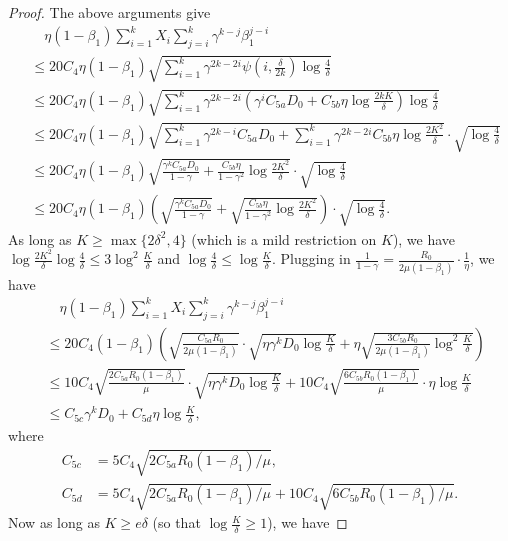 \begin{proof}
The above arguments give 
\begin{align*}
    &\quad \eta (1-\beta_1)\sum_{i=1}^{k}X_i  \sum_{j=i}^{k}\gamma^{k-j}\beta_1^{j-i} \\ &\leq 20C_4\eta(1-\beta_1)\sqrt{\sum_{i=1}^{k}\gamma^{2k-2i} \psi\left(i,\frac{\delta}{2k}\right)\log\frac{4}{\delta}} \\
    &\leq 20C_4\eta(1-\beta_1)\sqrt{\sum_{i=1}^{k}\gamma^{2k-2i} \left(\gamma
    ^i C_{5a}D_0 + C_{5b} \eta \log \frac{2kK}{\delta}\right)\log\frac{4}{\delta}} \\
    &\leq 20C_4\eta(1-\beta_1)\sqrt{\sum_{i=1}^{k}\gamma^{2k-i} C_{5a}D_0 + \sum_{i=1}^{k}\gamma^{2k-2i} C_{5b}\eta\log\frac{2K^2}{\delta}}\cdot \sqrt{\log\frac{4}{\delta}} \\
    &\leq 20C_4\eta(1-\beta_1)\sqrt{\frac{\gamma^{k}C_{5a}D_0}{1-\gamma} + \frac{C_{5b}\eta}{1-\gamma^2}\log\frac{2K^2}{\delta}}\cdot \sqrt{\log\frac{4}{\delta}} \\
    &\leq 20C_4\eta(1-\beta_1)\left(\sqrt{\frac{\gamma^{k}C_{5a}D_0}{1-\gamma}} + \sqrt{\frac{C_{5b}\eta}{1-\gamma^2}\log\frac{2K^2}{\delta}} \right) \cdot \sqrt{\log\frac{4}{\delta}}.
\end{align*}
As long as $K \geq \max\{2\delta^2, 4\}$ (which is a mild restriction on $K$), we have $\log\frac{2K^2}{\delta}\log\frac{4}{\delta} \leq 3\log^2\frac{K}{\delta}$ and $\log\frac{4}{\delta} \leq \log{\frac{K}{\delta}}$. Plugging in $\frac{1}{1-\gamma} = \frac{R_0}{2\mu(1-\beta_1)}\cdot \frac{1}{\eta}$, we have
\begin{align*}
    &\quad \eta (1-\beta_1)\sum_{i=1}^{k}X_i  \sum_{j=i}^{k}\gamma^{k-j}\beta_1^{j-i} \\
    &\leq 20C_4(1-\beta_1)\left(\sqrt{\frac{C_{5a}R_0}{2\mu(1-\beta_1)}}\cdot \sqrt{\eta\gamma^{k}D_0\log\frac{K}{\delta}}+\eta\sqrt{\frac{3C_{5b}R_0}{2\mu(1-\beta_1)}\log^2\frac{K}{\delta}}\right) \\
    & \leq 10C_4 \sqrt{\frac{2C_{5a}R_0(1-\beta_1)}{\mu}}\cdot \sqrt{\eta\gamma^{k}D_0\log\frac{K}{\delta}} + 10C_4 \sqrt{\frac{6C_{5b}R_0(1-\beta_1)}{\mu}}\cdot \eta \log \frac{K}{\delta} \\
    &\leq C_{5c}\gamma^k D_0 + C_{5d}\eta\log \frac{K}{\delta},
\end{align*}
where \begin{align*}
    C_{5c} &=  5C_4\sqrt{2C_{5a}R_0(1-\beta_1)/\mu}, \\ C_{5d} &=  5C_4\sqrt{2C_{5a}R_0(1-\beta_1)/\mu} + 10C_4\sqrt{6C_{5b}R_0(1-\beta_1)/\mu}.\end{align*}Now as long as $K \geq e\delta$ (so that $\log\frac{K}{\delta}\geq 1$), we have 

\end{proof}
